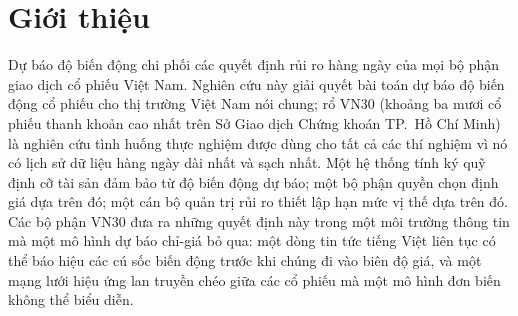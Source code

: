 \documentclass[runningheads]{llncs}
\begin{document}
\begin{abstract}
trung bình thấp nhất thay đổi theo horizon. Trên QLIKE, HAR có giá trị trung bình thấp nhất tại h5, h10,
và h22 còn backbone LSTM chỉ-giá có giá trị thấp nhất tại h1. Các kiểm định Diebold--Mariano trên dự báo
seed-ensembled, chạy trên các họ hàm mất mát QLIKE, sai số bình phương, và sai số tuyệt đối, cho thấy
không mô hình nào được ưu tiên trên cả ba. Qua cả năm metric, không cấu hình nào vượt HAR một cách nhất
quán hoặc có ý nghĩa. Đóng góp của bài báo là một quy trình quy đóng góp dựa trên ablation an toàn với
rò rỉ dữ liệu cho một mô hình graph-attention tin tức với hiệu ứng lan truyền có hướng, đối chiếu với một
baseline HAR mạnh trên dữ liệu VN30 hàng ngày thưa.

\end{abstract}
%
\section{Giới thiệu}
\label{sec:intro}
Dự báo độ biến động chi phối các quyết định rủi ro hàng ngày của mọi bộ phận giao dịch cổ phiếu Việt
Nam. Nghiên cứu này giải quyết bài toán dự báo độ biến động cổ phiếu cho thị trường Việt Nam nói chung;
rổ VN30 (khoảng ba mươi cổ phiếu thanh khoản cao nhất trên Sở Giao dịch Chứng khoán TP.\ Hồ Chí Minh)
là nghiên cứu tình huống thực nghiệm được dùng cho tất cả các thí nghiệm vì nó có lịch sử dữ liệu hàng
ngày dài nhất và sạch nhất. Một hệ thống tính ký quỹ định cỡ tài sản đảm bảo từ độ biến động dự báo; một
bộ phận quyền chọn định giá dựa trên đó; một cán bộ quản trị rủi ro thiết lập hạn mức vị thế dựa trên đó.
Các bộ phận VN30 đưa ra những quyết định này trong một môi trường thông tin mà một mô hình dự báo chỉ-giá
bỏ qua: một dòng tin tức tiếng Việt liên tục có thể báo hiệu các cú sốc biến động trước khi chúng đi vào
biên độ giá, và một mạng lưới hiệu ứng lan truyền chéo giữa các cổ phiếu mà một mô hình đơn biến không
thể biểu diễn.
\end{document}
